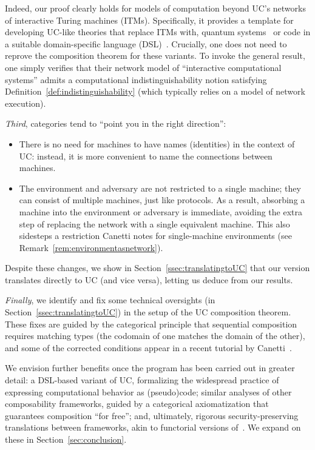 \noindent Indeed, our proof clearly holds for models of computation beyond UC's networks of interactive Turing machines (ITMs). Specifically, it provides a template for developing UC-like theories that replace ITMs with, \eg quantum systems~\cite{Unr10} or code in a suitable domain-specific language (DSL)~\cite{
CSV19:EasyUC,
DBLP:journals/pacmpl/GancherSFSM23,
LHM19}.
Crucially, one does not need to reprove the composition theorem for these variants. To invoke the general result, one simply verifies that their network model of ``interactive computational systems'' admits a computational indistinguishability notion satisfying Definition~\ref{def:indistinguishability} (which typically relies on a model of network execution).

\emph{Third}, categories tend to ``point you in the right direction'':
\begin{itemize}
    \item There is no need for machines to have names (identities) in the context of UC: instead, it is more convenient to name the connections between machines.
    \item The environment and adversary are not restricted to a single machine; they can consist of multiple machines, just like protocols. As a result, absorbing a machine into the environment or adversary is immediate, avoiding the extra step of replacing the network with a single equivalent machine. This also sidesteps a restriction Canetti notes for single-machine environments (see Remark~\ref{rem:environmentasnetwork}).
\end{itemize}
Despite these changes, we show in Section~\ref{ssec:translatingtoUC} that our version translates directly to UC (and vice versa), letting us deduce \cite[Theorem~3]{Can20} from our results. 

\emph{Finally}, we identify and fix some technical oversights (in Section~\ref{ssec:translatingtoUC}) in the setup of the UC composition theorem. These fixes are guided by the categorical principle that sequential composition requires matching types (\ie the codomain of one matches the domain of the other), and some of the corrected conditions appear in a recent tutorial by Canetti~\cite{Can25:tutorial}.

We envision further benefits once the program has been carried out in greater detail: a DSL-based variant of UC, formalizing the widespread practice of expressing computational behavior as (pseudo)code; similar analyses of other composability frameworks, guided by a categorical axiomatization that guarantees composition ``for free''; and, ultimately, rigorous security-preserving translations between frameworks, akin to functorial versions of~\cite{RKC:embeddingUCinIITM}. We expand on these in Section~\ref{sec:conclusion}.

